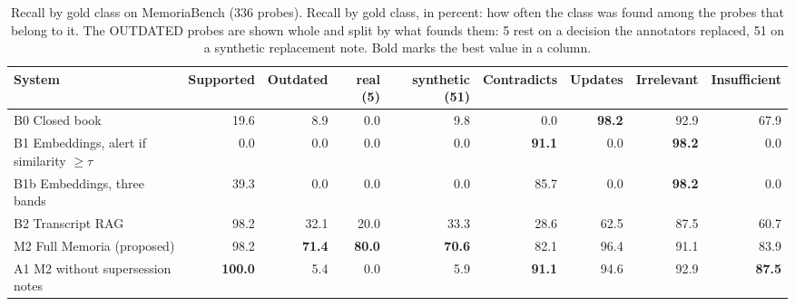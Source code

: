 \begin{table}[tbp]
\centering
\small
\caption{Recall by gold class on MemoriaBench (336 probes). Recall by gold class, in percent: how often the class was found among the probes that belong to it. The OUTDATED probes are shown whole and split by what founds them: 5 rest on a decision the annotators replaced, 51 on a synthetic replacement note. Bold marks the best value in a column.}
\label{tab:memoriabench-classes}
\begin{tabular}{@{}lrrrrrrrr@{}}
\toprule
System & Supported & Outdated & \hspace{1em}real (5) & \hspace{1em}synthetic (51) & Contradicts & Updates & Irrelevant & Insufficient \\
\midrule
B0 Closed book & 19.6 & 8.9 & 0.0 & 9.8 & 0.0 & \textbf{98.2} & 92.9 & 67.9 \\
B1 Embeddings, alert if similarity $\ge \tau$ & 0.0 & 0.0 & 0.0 & 0.0 & \textbf{91.1} & 0.0 & \textbf{98.2} & 0.0 \\
B1b Embeddings, three bands & 39.3 & 0.0 & 0.0 & 0.0 & 85.7 & 0.0 & \textbf{98.2} & 0.0 \\
B2 Transcript RAG & 98.2 & 32.1 & 20.0 & 33.3 & 28.6 & 62.5 & 87.5 & 60.7 \\
\midrule
M2 Full Memoria (proposed) & 98.2 & \textbf{71.4} & \textbf{80.0} & \textbf{70.6} & 82.1 & 96.4 & 91.1 & 83.9 \\
A1 M2 without supersession notes & \textbf{100.0} & 5.4 & 0.0 & 5.9 & \textbf{91.1} & 94.6 & 92.9 & \textbf{87.5} \\
\bottomrule
\end{tabular}
\end{table}
